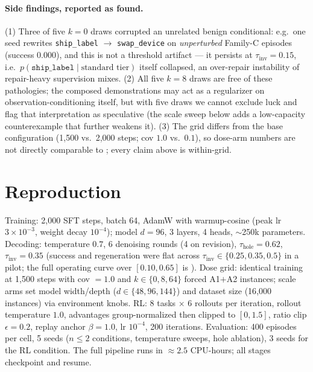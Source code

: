 \documentclass{article}
\newcommand{\tinv}{\tau_{\mathrm{inv}}}
\newcommand{\thole}{\tau_{\mathrm{hole}}}
\begin{document}
\paragraph{Side findings, reported as found.} (1) Three of five $k{=}0$ draws corrupted an
unrelated benign conditional: e.g.\ one seed rewrites \texttt{ship\_label} $\to$
\texttt{swap\_device} on \emph{unperturbed} Family-C episodes (success $0.000$), and this is not a
threshold artifact --- it persists at $\tinv = 0.15$, i.e.\
$p(\texttt{ship\_label} \mid \text{standard tier})$ itself collapsed, an over-repair instability
of repair-heavy supervision mixes. (2) All five $k{=}8$ draws are free of these pathologies; the
composed demonstrations may act as a regularizer on observation-conditioning itself, but with five
draws we cannot exclude luck and flag that interpretation as speculative (the scale sweep below
adds a low-capacity counterexample that further weakens it). (3) The grid differs from
the base configuration (1{,}500 vs.\ 2{,}000 steps; cov $1.0$ vs.\ $0.1$), so dose-arm numbers are
not directly comparable to \Cref{tab:main}; every claim above is within-grid.

\section{Reproduction}\label{app:repro}
Training: 2{,}000 SFT steps, batch 64, AdamW with warmup-cosine (peak lr $3\times10^{-3}$, weight
decay $10^{-4}$); model $d{=}96$, 3 layers, 4 heads, $\sim$250k parameters. Decoding: temperature
$0.7$, 6 denoising rounds (4 on revision), $\thole{=}0.62$, $\tinv{=}0.35$ (success and regeneration
were flat across $\tinv\in\{0.25,0.35,0.5\}$ in a pilot; the full operating curve over
$[0.10,0.65]$ is \Cref{fig:tau}). Dose grid: identical training at 1{,}500 steps with cov $=1.0$
and $k \in \{0,8,64\}$ forced A1$+$A2 instances; scale arms set model width/depth
($d \in \{48, 96, 144\}$) and dataset size (16{,}000 instances) via environment knobs. RL: 8 tasks $\times$ 6 rollouts per
iteration, rollout temperature $1.0$, advantages group-normalized then clipped to $[0,1.5]$, ratio
clip $\epsilon{=}0.2$, replay anchor $\beta{=}1.0$, lr $10^{-4}$, 200 iterations. Evaluation: 400
episodes per cell, 5 seeds ($n{\leq}2$ conditions, temperature sweeps, hole ablation), 3 seeds for
the RL condition. The full pipeline runs in ${\approx}2.5$ CPU-hours; all stages checkpoint and
resume.
\end{document}
